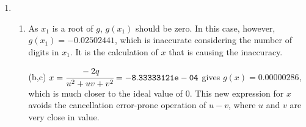 \documentclass[12pt,letterpaper]{article}
\begin{document}
\begin{enumerate}
  \item
    \begin{enumerate}
      \item As $x_1$ is a root of $g$, $g(x_1)$ should be zero. In this case,
        however, $g(x_1) = -0.02502441$, which is inaccurate considering the
        number of digits in $x_1$. It is the calculation of $x$ that is causing
        the inaccuracy.
      \item[(b,c)] $x = \cfrac{-2q}{u^2+uv+v^2} = {\tt -8.33333121e-04}$ gives
        $g(x) = 0.00000286$, which is much closer to the ideal value of $0$.
        This new expression for $x$ avoids the cancellation error-prone
        operation of $u-v$, where $u$ and $v$ are very close in value.
    \end{enumerate}
\end{enumerate}
\end{document}
